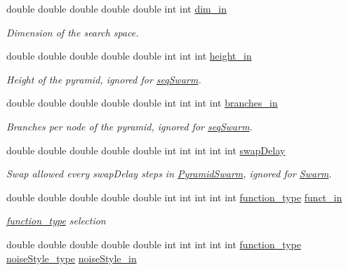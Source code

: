\begin{CompactItemize}
double double double double double int int \hyperlink{classPSO_e65adcb9ab4ffcbbaae4af0c4268e69f}{dim\_\-in}
\begin{CompactList}\small\item\em Dimension of the search space. \item\end{CompactList}\item 
double double double double double int int int \hyperlink{classPSO_ee0432eff40a83e317cec0948a6b84b6}{height\_\-in}
\begin{CompactList}\small\item\em Height of the pyramid, ignored for \hyperlink{pso_8h_42bcedc2c7cf9459c9669f9df4f61ebdde370d79b6c81ecae74ad5b24383eeca}{seqSwarm}. \item\end{CompactList}\item 
double double double double double int int int int \hyperlink{classPSO_97fa3e1fd7cd363e203af942f79c75e8}{branches\_\-in}
\begin{CompactList}\small\item\em Branches per node of the pyramid, ignored for \hyperlink{pso_8h_42bcedc2c7cf9459c9669f9df4f61ebdde370d79b6c81ecae74ad5b24383eeca}{seqSwarm}. \item\end{CompactList}\item 
double double double double double int int int int int \hyperlink{classPSO_4c7660d6fa0c98028ac4f3bb1cd70d1d}{swapDelay}
\begin{CompactList}\small\item\em Swap allowed every swapDelay steps in \hyperlink{classPyramidSwarm}{PyramidSwarm}, ignored for \hyperlink{classSwarm}{Swarm}. \item\end{CompactList}\item 
double double double double double int int int int int \hyperlink{optfunctions_8h_6e6333c061b2073ba9abaaf67e20164b}{function\_\-type} \hyperlink{classPSO_8299ea6538ac64b56eee6f501dfac3b2}{funct\_\-in}
\begin{CompactList}\small\item\em \hyperlink{optfunctions_8h_6e6333c061b2073ba9abaaf67e20164b}{function\_\-type} selection \item\end{CompactList}\item 
double double double double double int int int int int \hyperlink{optfunctions_8h_6e6333c061b2073ba9abaaf67e20164b}{function\_\-type} \hyperlink{optfunctions_8h_b2443d91d959f9b3a033d74864a28862}{noiseStyle\_\-type} \hyperlink{classPSO_101f44d2d9a8212e864ee9264008f82c}{noiseStyle\_\-in}

\end{CompactItemize}
